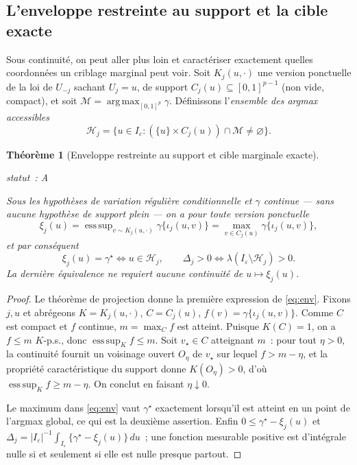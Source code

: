 \documentclass[11pt]{article}
\theoremstyle{plain}
\newtheorem{theoreme}{Théorème}[section]
\theoremstyle{definition}
\theoremstyle{remark}
\DeclareMathOperator*{\esssup}{ess\,sup}
\DeclareMathOperator*{\argmax}{arg\,max}
\newcommand{\1}{\mathbf 1}
\newcommand{\I}{I_\varepsilon}
\newcommand{\statut}[1]{%
  \nopagebreak\par\nopagebreak
  \hfill{\normalfont\footnotesize\textcolor{gris}{statut~: #1}}%
  \par\nopagebreak\vspace{-2pt}}
\begin{document}
\subsection{L'enveloppe restreinte au support et la cible exacte}

Sous continuité, on peut aller plus loin et caractériser exactement
quelles coordonnées un criblage marginal peut voir. Soit
$K_j(u,\cdot)$ une version ponctuelle de la loi de $U_{-j}$ sachant
$U_j=u$, de support $C_j(u)\subseteq[0,1]^{p-1}$ (non vide, compact), et
soit $\mathcal M=\argmax_{[0,1]^p}\gamma$. Définissons l'\emph{ensemble
des argmax accessibles}
\[
 \mathcal H_j=\bigl\{u\in\I:(\{u\}\times C_j(u))\cap\mathcal M\ne\varnothing\bigr\}.
\]

\begin{theoreme}[Enveloppe restreinte au support et cible marginale exacte]
\label{thm:enveloppe}
\statut{A}
Sous les hypothèses de variation régulière conditionnelle et $\gamma$
continue --- \emph{sans aucune hypothèse de support plein} --- on a pour
toute version ponctuelle
\begin{equation}
 \xi_j(u)=\esssup_{v\sim K_j(u,\cdot)}\gamma\{\iota_j(u,v)\}
        =\max_{v\in C_j(u)}\gamma\{\iota_j(u,v)\},
 \label{eq:env}
\end{equation}
et par conséquent
\[
 \xi_j(u)=\gamma^\star\iff u\in\mathcal H_j,
 \qquad
 \Delta_j>0\iff\lambda(\I\setminus\mathcal H_j)>0 .
\]
La dernière équivalence ne requiert aucune continuité de
$u\mapsto\xi_j(u)$.
\end{theoreme}

\begin{proof}
Le théorème de projection donne la première expression de \eqref{eq:env}.
Fixons $j,u$ et abrégeons $K=K_j(u,\cdot)$, $C=C_j(u)$,
$f(v)=\gamma\{\iota_j(u,v)\}$. Comme $C$ est compact et $f$ continue,
$m=\max_Cf$ est atteint. Puisque $K(C)=1$, on a $f\le m$
$K$-p.s., donc $\esssup_Kf\le m$. Soit $v_\star\in C$ atteignant $m$~:
pour tout $\eta>0$, la continuité fournit un voisinage ouvert $O_\eta$ de
$v_\star$ sur lequel $f>m-\eta$, et la propriété caractéristique du
support donne $K(O_\eta)>0$, d'où $\esssup_Kf\ge m-\eta$. On conclut en
faisant $\eta\downarrow0$.

Le maximum dans \eqref{eq:env} vaut $\gamma^\star$ exactement lorsqu'il
est atteint en un point de l'argmax global, ce qui est la deuxième
assertion. Enfin $0\le\gamma^\star-\xi_j(u)$ et
$\Delta_j=|\I|^{-1}\int_{\I}\{\gamma^\star-\xi_j(u)\}\,du$~; une fonction
mesurable positive est d'intégrale nulle si et seulement si elle est
nulle presque partout.
\end{proof}
\end{document}
